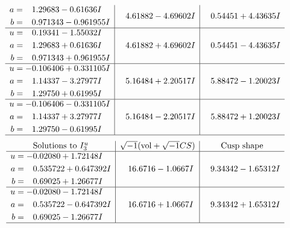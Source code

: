 \documentclass[1p]{elsarticle_modified}
\theoremstyle{definition}
\newcommand{\I}{\sqrt{-1}}
\begin{document}
$$\begin{array}{c|c|c}
\begin{aligned}
a &= \phantom{-}1.29683 - 0.61636 I \\
b &= \phantom{-}0.971343 - 0.961955 I\end{aligned}
 & \phantom{-}4.61882 - 4.69602 I & \phantom{-}0.54451 + 4.43635 I \\ \hline\begin{aligned}
u &= \phantom{-}0.19341 - 1.55032 I \\
a &= \phantom{-}1.29683 + 0.61636 I \\
b &= \phantom{-}0.971343 + 0.961955 I\end{aligned}
 & \phantom{-}4.61882 + 4.69602 I & \phantom{-}0.54451 - 4.43635 I \\ \hline\begin{aligned}
u &= -0.106406 + 0.331105 I \\
a &= \phantom{-}1.14337 - 3.27977 I \\
b &= \phantom{-}1.29750 + 0.61995 I\end{aligned}
 & \phantom{-}5.16484 + 2.20517 I & \phantom{-}5.88472 - 1.20023 I \\ \hline\begin{aligned}
u &= -0.106406 - 0.331105 I \\
a &= \phantom{-}1.14337 + 3.27977 I \\
b &= \phantom{-}1.29750 - 0.61995 I\end{aligned}
 & \phantom{-}5.16484 - 2.20517 I & \phantom{-}5.88472 + 1.20023 I\\
 \hline 
 \end{array}$$\newpage$$\begin{array}{c|c|c}  
\text{Solutions to }I^u_{3}& \I (\text{vol} + \sqrt{-1}CS) & \text{Cusp shape}\\
 \hline 
\begin{aligned}
u &= -0.02080 + 1.72148 I \\
a &= \phantom{-}0.535722 + 0.647392 I \\
b &= \phantom{-}0.69025 + 1.26677 I\end{aligned}
 & \phantom{-}16.6716 - 1.0667 I & \phantom{-}9.34342 - 1.65312 I \\ \hline\begin{aligned}
u &= -0.02080 - 1.72148 I \\
a &= \phantom{-}0.535722 - 0.647392 I \\
b &= \phantom{-}0.69025 - 1.26677 I\end{aligned}
 & \phantom{-}16.6716 + 1.0667 I & \phantom{-}9.34342 + 1.65312 I\\
 \hline 
 \end{array}$$\newpage
\end{document}
